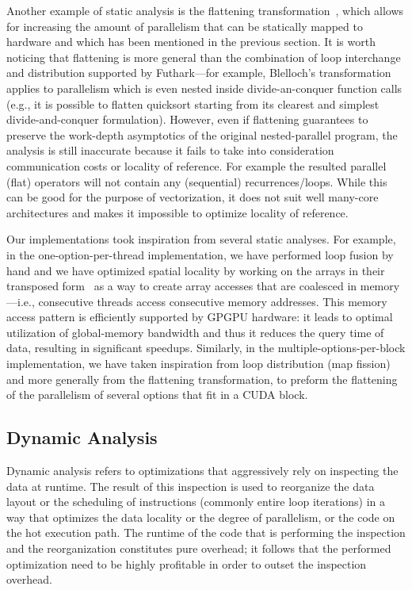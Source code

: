 Another example of static analysis is the flattening transformation~\cite{blelloch1994implementation}, which allows for increasing the amount of parallelism that can be statically mapped to hardware and which has been mentioned in the previous section. It is worth noticing that flattening is more general than the combination of loop interchange and distribution supported by Futhark---for example, Blelloch's transformation applies to parallelism which is even nested inside divide-an-conquer function calls (e.g., it is possible to flatten quicksort starting from its clearest and simplest divide-and-conquer formulation).  However, even if flattening guarantees to preserve the work-depth asymptotics of the original nested-parallel program, the analysis is still inaccurate because it fails to take into consideration communication costs or locality of reference. For example the resulted parallel (flat) operators will not contain any (sequential) recurrences/loops. While this can be good for the purpose of vectorization, it does not suit well many-core architectures and makes it impossible to optimize locality of reference.

Our implementations took inspiration from several static analyses. For example, in the one-option-per-thread implementation, we have performed loop fusion by hand and we have optimized spatial locality by working on the arrays in their transposed form~\cite{LexiFiPricing} as a way to create array accesses that are coalesced in memory---i.e., consecutive threads access consecutive memory addresses. This memory access pattern is efficiently supported by GPGPU hardware: it leads to optimal utilization of global-memory bandwidth and thus it reduces the query time of data, resulting in significant speedups.   Similarly, in the multiple-options-per-block implementation, we have taken inspiration from loop distribution (map fission) and more generally from the flattening transformation, to preform the flattening of the parallelism of several options that fit in a CUDA block. 

\subsection{Dynamic Analysis}
\label{relwork-dyn}

Dynamic analysis refers to optimizations that aggressively rely on inspecting the data at runtime. The result of this inspection is used to reorganize the data layout or the scheduling of instructions (commonly entire loop iterations) in a way that optimizes the data locality or the degree of parallelism, or the code on the hot execution path.  The runtime of the code that is performing the inspection and the reorganization constitutes pure overhead; it follows that the performed optimization need to be highly profitable in order to outset the inspection overhead. 

